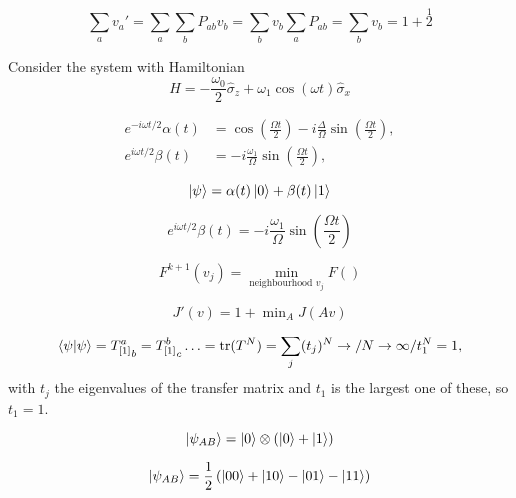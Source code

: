 

% 
% 
% 



\begin{equation*}
	\sum_a v_a' = \sum_a \sum_b P_{ab} v_b = \sum_b v_b \sum_a P_{ab} = \sum_b v_b = 1 + \overset{1}{2}
\end{equation*}

Consider the system with Hamiltonian
\begin{equation*}
	\hat{H} = - \frac{\omega_0}{2} \hat{\sigma}_z + \omega_1 \cos(\omega t) \hat{\sigma}_x
\end{equation*}


\begin{align*}
	e^{-i\omega t/2} \alpha(t) &= \cos\left(\frac{\Omega t}{2}\right) - i \frac{\Delta}{\Omega} \sin\left(\frac{\Omega t}{2}\right), \\
	e^{i\omega t/2} \beta(t) &= -i \frac{\omega_1}{\Omega} \sin\left(\frac{\Omega t}{2}\right),
\end{align*}

\begin{equation*}
	\left| \psi \right\rangle = \alpha(t) \left| 0 \right\rangle + \beta(t) \left| 1 \right\rangle
\end{equation*}

$$ e^{i\omega t/2} \beta (t) = -i \frac{\omega_1}{\Omega} \sin\left(\frac{\Omega t}{2}\right)$$

\begin{equation*}
	F^{k+1}(v_j) = \min_{\text{neighbourhood }v_j} F()
\end{equation*}

\begin{equation*}
	J'(v) = 1 + \min\nolimits_A J(Av)
\end{equation*}

\begin{equation*}
	\langle\psi|\psi\rangle = {T_{[1]}^a}_b = {T_{[1]}^b}_c \ldots = \mathop{\mathrm{tr}}\nolimits (T^N) = \sum_j (t_j)^N \to / N \to \infty / t_1^N =1,
\end{equation*}
with $t_j$ the eigenvalues of the transfer matrix and $t_1$ is the  largest one of these, so $t_1 = 1$.




\begin{equation*}
	\left| \psi_{AB} \right\rangle = \left| 0 \right\rangle \otimes  \left(\left| 0 \right\rangle+ \left| 1 \right\rangle\right)
\end{equation*}


\begin{equation*}
	\left| \psi_{AB} \right\rangle = \frac{1}{2}\left(\left| 00 \right\rangle + \left| 10 \right\rangle - \left| 01 \right\rangle - \left| 11 \right\rangle\right)
\end{equation*}

